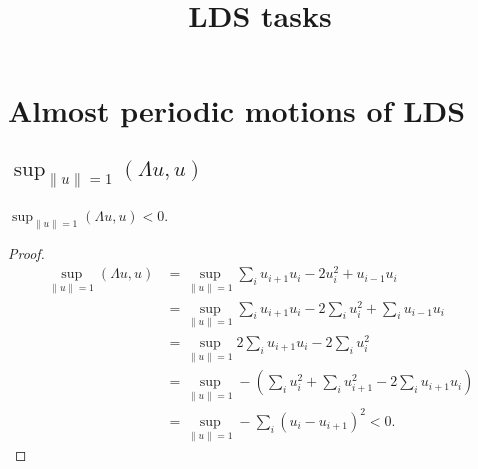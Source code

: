 


\title{LDS tasks}

\maketitle
\tableofcontents
\thispagestyle{empty}
\newpage
\section{Almost periodic motions of LDS}
\subsection{\(\sup_{\|u\|=1} (\Lambda u, u)\)}
\begin{lemma}
\(\sup_{\|u\|=1} (\Lambda u, u) < 0\).
\end{lemma} 
\begin{proof}
    \begin{align*}
        \sup_{\|u\|=1} (\Lambda u, u) &= \sup_{\|u\|=1} \sum_{i} u_{i+1} u_i - 2 u_i^2 + u_{i-1} u_i \\
        &= \sup_{\|u\|=1} \sum_{i} u_{i+1} u_i - 2 \sum_i u_i^2 + \sum_i u_{i-1} u_i \\
        &= \sup_{\|u\|=1} 2 \sum_{i} u_{i+1} u_i - 2 \sum_i u_i^2 \\
        &= \sup_{\|u\|=1} - \left( \sum_i u_i^2 + \sum_i u_{i+1}^2 - 2\sum_{i} u_{i+1} u_i \right) \\
        &= \sup_{\|u\|=1} - \sum_i (u_i - u_{i+1})^2 < 0.
    \end{align*}
\end{proof}
